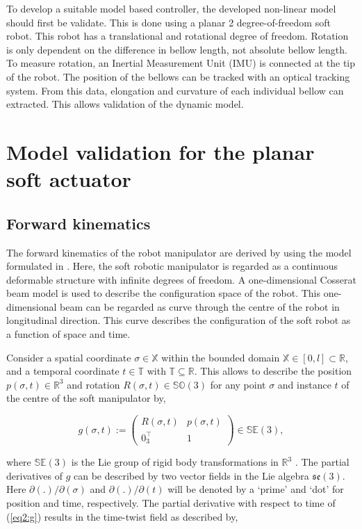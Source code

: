 
To develop a suitable model based controller, the developed non-linear model should first be validate. This is done using a planar 2 degree-of-freedom soft robot. This robot has a translational and rotational degree of freedom. Rotation is only dependent on the difference in bellow length, not absolute bellow length. To measure rotation, an Inertial Measurement Unit (IMU) is connected at the tip of the robot. The position of the bellows can be tracked with an optical tracking system. From this data, elongation and curvature of each individual bellow can extracted. This allows validation of the dynamic model.

\section{Model validation for the planar soft actuator}

\subsection{Forward kinematics}

The forward kinematics of the robot manipulator are derived by using the model formulated in \cite{Caasenbrood2020}. Here, the soft robotic manipulator is regarded as a continuous deformable structure with infinite degrees of freedom. A one-dimensional Cosserat beam model is used to describe the configuration space of the robot. This one-dimensional beam can be regarded as curve through the centre of the robot in longitudinal direction. This curve describes the configuration of the soft robot as a function of space and time. 

Consider a spatial coordinate $\sigma \in \mathbb{X}$ within the bounded domain $\mathbb{X} \in [0,l] \subset \mathbb{R}$, and a temporal coordinate $t \in  \mathbb{T}$ with $\mathbb{T} \subseteq \mathbb{R}$. This allows to describe the position $p(\sigma,t) \in \mathbb{R}^3$ and rotation $R(\sigma,t) \in \mathbb{SO}(3)$ 
for any point $\sigma$ and instance $t$ of the centre of the soft manipulator by,


\begin{equation}
    g(\sigma,t) := \begin{pmatrix}  R(\sigma,t) & p(\sigma,t) \\ 0_3^\top & 1 \end{pmatrix} \in \mathbb{SE}(3),
    \label{eq2:g}
\end{equation}

where $\mathbb{SE}(3)$ is the Lie group of rigid body transformations in $\mathbb{R}^3$ \cite{Sola2018}. The partial derivatives of $g$ can be described by two vector fields in the Lie algebra $\mathfrak{se}(3)$. Here $\partial (.)/\partial(\sigma)$ and $\partial (.)/\partial(t)$ will be denoted by a `prime' and `dot' for position and time, respectively. The partial derivative with respect to time of (\ref{eq2:g}) results in the time-twist field as described by,

